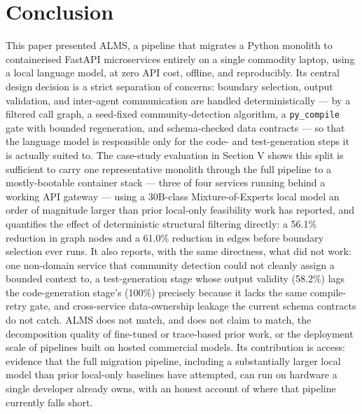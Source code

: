 \documentclass[conference]{IEEEtran}
\begin{document}
\section{Conclusion}

This paper presented ALMS, a pipeline that migrates a Python monolith to containerised FastAPI microservices entirely on a single commodity laptop, using a local language model, at zero API cost, offline, and reproducibly. Its central design decision is a strict separation of concerns: boundary selection, output validation, and inter-agent communication are handled deterministically --- by a filtered call graph, a seed-fixed community-detection algorithm, a \texttt{py\_compile} gate with bounded regeneration, and schema-checked data contracts --- so that the language model is responsible only for the code- and test-generation steps it is actually suited to. The case-study evaluation in Section V shows this split is sufficient to carry one representative monolith through the full pipeline to a mostly-bootable container stack --- three of four services running behind a working API gateway --- using a 30B-class Mixture-of-Experts local model an order of magnitude larger than prior local-only feasibility work has reported, and quantifies the effect of deterministic structural filtering directly: a 56.1\% reduction in graph nodes and a 61.0\% reduction in edges before boundary selection ever runs. It also reports, with the same directness, what did not work: one non-domain service that community detection could not cleanly assign a bounded context to, a test-generation stage whose output validity (58.2\%) lags the code-generation stage's (100\%) precisely because it lacks the same compile-retry gate, and cross-service data-ownership leakage the current schema contracts do not catch. ALMS does not match, and does not claim to match, the decomposition quality of fine-tuned or trace-based prior work, or the deployment scale of pipelines built on hosted commercial models. Its contribution is access: evidence that the full migration pipeline, including a substantially larger local model than prior local-only baselines have attempted, can run on hardware a single developer already owns, with an honest account of where that pipeline currently falls short.
\end{document}
